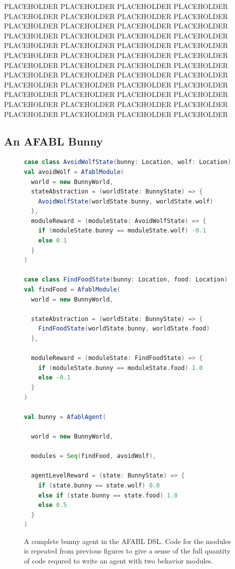 PLACEHOLDER PLACEHOLDER PLACEHOLDER PLACEHOLDER PLACEHOLDER PLACEHOLDER PLACEHOLDER PLACEHOLDER PLACEHOLDER PLACEHOLDER PLACEHOLDER PLACEHOLDER PLACEHOLDER PLACEHOLDER PLACEHOLDER PLACEHOLDER PLACEHOLDER PLACEHOLDER PLACEHOLDER PLACEHOLDER PLACEHOLDER PLACEHOLDER PLACEHOLDER PLACEHOLDER PLACEHOLDER PLACEHOLDER PLACEHOLDER PLACEHOLDER PLACEHOLDER PLACEHOLDER PLACEHOLDER PLACEHOLDER PLACEHOLDER PLACEHOLDER PLACEHOLDER PLACEHOLDER PLACEHOLDER PLACEHOLDER PLACEHOLDER PLACEHOLDER PLACEHOLDER PLACEHOLDER PLACEHOLDER PLACEHOLDER PLACEHOLDER PLACEHOLDER PLACEHOLDER PLACEHOLDER

\subsection{An AFABL Bunny}

\begin{figure}[ht]
\begin{center}

\begin{lstlisting}[language=Scala]
case class AvoidWolfState(bunny: Location, wolf: Location)
val avoidWolf = AfablModule(
  world = new BunnyWorld,
  stateAbstraction = (worldState: BunnyState) => {
    AvoidWolfState(worldState.bunny, worldState.wolf)
  },
  moduleReward = (moduleState: AvoidWolfState) => {
    if (moduleState.bunny == moduleState.wolf) -0.1
    else 0.1
  }
)

case class FindFoodState(bunny: Location, food: Location)
val findFood = AfablModule(
  world = new BunnyWorld,

  stateAbstraction = (worldState: BunnyState) => {
    FindFoodState(worldState.bunny, worldState.food)
  },

  moduleReward = (moduleState: FindFoodState) => {
    if (moduleState.bunny == moduleState.food) 1.0
    else -0.1
  }
)

val bunny = AfablAgent(

  world = new BunnyWorld,

  modules = Seq(findFood, avoidWolf),

  agentLevelReward = (state: BunnyState) => {
    if (state.bunny == state.wolf) 0.0
    else if (state.bunny == state.food) 1.0
    else 0.5
  }
)
\end{lstlisting}

\caption{A complete bunny agent in the AFABL DSL. Code for the modules is repeated from previous figures to give a sense of the full quantity of code requred to write an agent with two behavior modules.}
\end{center}
\label{fig:afabl-bunny-code}
\end{figure}

